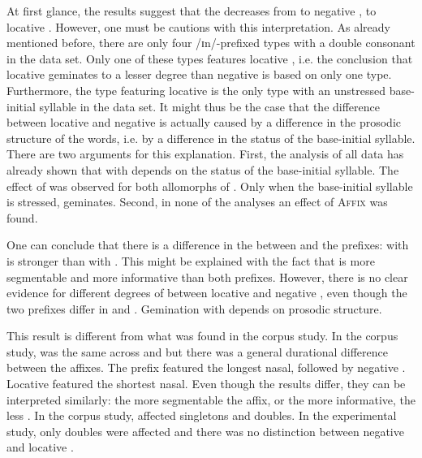 At first glance, the results suggest that the  decreases from  to negative , to locative .  However, one must be cautions with this interpretation. As already mentioned before, there are only four /ɪn/-prefixed types with a double consonant in the data set. Only one of these types features locative , i.e. the conclusion that locative  geminates to a lesser degree than negative  is based on only one type. Furthermore, the type featuring locative  is the only type with an unstressed base-initial syllable in the data set. 
It might thus be the case that the difference between locative and negative  is actually caused by a difference in the prosodic structure of the words, i.e. by a difference in the  status of the base-initial syllable. There are two arguments for this explanation. First, the analysis of all data has already shown that  with  depends on the  status of the base-initial syllable. The effect of  was observed for both allomorphs of  . Only when the base-initial syllable is stressed,  geminates. 
 Second, in none of the analyses an effect of \textsc{Affix} was found. 


One can conclude that there is a difference in the  between  and the prefixes:  with  is stronger than  with . This might be explained with the fact that  is more segmentable and more informative than both prefixes. However, there is no clear evidence for different degrees of  between  locative  and negative , even though the two prefixes differ in  and . Gemination with  depends on prosodic structure.

 This result is different from what was found in the corpus study. In the corpus study,  was the same across  and  but there was a general durational difference between the affixes. The prefix  featured the longest nasal, followed by negative . Locative  featured the shortest nasal. 
Even though the results differ, they can be interpreted similarly: the more segmentable the affix, or the more informative, the less . In the corpus study,   affected singletons and doubles. In the experimental study, only doubles were affected and there was no distinction between negative and locative .






